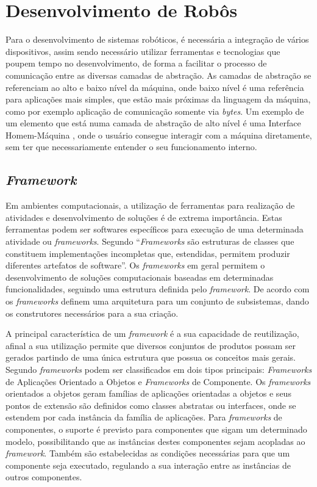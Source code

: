 \section{Desenvolvimento de Robôs}\label{sec:desen_robo}
Para o desenvolvimento de sistemas robóticos, é necessária a integração de vários dispositivos, assim sendo necessário utilizar ferramentas e tecnologias que poupem tempo no desenvolvimento, de forma a facilitar o processo de comunicação entre as diversas camadas de abstração. 
As camadas de abstração se referenciam ao alto e baixo nível da máquina, onde baixo nível é uma referência para aplicações mais simples, que estão mais próximas da linguagem da máquina, como por exemplo aplicação de comunicação somente via \textit{bytes}. Um exemplo de um elemento que está numa camada de abstração de alto nível é uma Interface Homem-Máquina , onde o usuário consegue interagir com a máquina diretamente, sem ter que necessariamente entender o seu funcionamento interno.

\subsection{\textit{Framework}}\label{sec:framework}
Em ambientes computacionais, a utilização de ferramentas para realização de atividades e desenvolvimento de soluções é de extrema importância. Estas ferramentas podem ser softwares específicos para execução de uma determinada atividade ou \textit{frameworks}.	
Segundo \cite{maxwel_framework} “\textit{Frameworks} são estruturas de classes que constituem implementações incompletas que, estendidas, permitem produzir diferentes artefatos de software”. Os \textit{frameworks} em geral permitem o desenvolvimento de soluções computacionais baseadas em determinadas funcionalidades, seguindo uma estrutura definida pelo \textit{framework}. De acordo com \cite{maxwel_framework} os \textit{frameworks} definem uma arquitetura para um conjunto de subsistemas, dando os construtores necessários para a sua criação.

A principal característica de um \textit{framework} é a sua capacidade de reutilização, afinal a sua utilização permite que diversos conjuntos de produtos possam ser gerados partindo de uma única estrutura que possua os conceitos mais gerais.
Segundo \cite{maxwel_framework} \textit{frameworks} podem ser classificados em dois tipos principais: \textit{Frameworks} de Aplicações Orientado a Objetos e \textit{Frameworks} de Componente.
Os \textit{frameworks} orientados a objetos geram famílias de aplicações orientadas a objetos e seus pontos de extensão são definidos como classes abstratas ou interfaces, onde se estendem por cada instância da família de aplicações.
Para \textit{frameworks} de componentes, o suporte é previsto para componentes que sigam um determinado modelo, possibilitando que as instâncias destes componentes sejam acopladas ao \textit{framework}. Também são estabelecidas as condições necessárias para que um componente seja executado, regulando a sua interação entre as instâncias de outros componentes.

